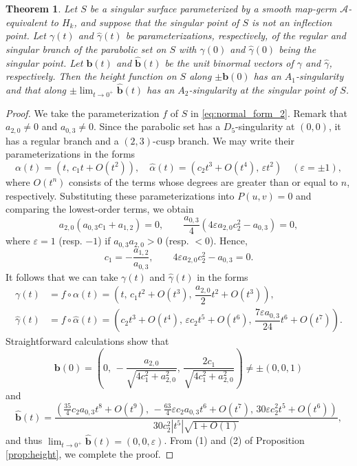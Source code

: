 \documentclass[12pt]{amsart}
\theoremstyle{plain}
\newtheorem{theorem}{Theorem}[section]
\theoremstyle{definition}
\renewcommand{\epsilon}{\varepsilon}
\begin{document}
\begin{theorem}
\label{thm:branch}
Let $S$ be a singular surface parameterized by a smooth map-germ $\mathcal{A}$-equivalent to $H_k$, and suppose that the singular point of $S$ is not an inflection point. 
Let $\gamma(t)$ and $\hat\gamma(t)$ be parameterizations, respectively, of the regular and singular branch of the parabolic set on $S$ with $\gamma(0)$ and $\hat\gamma(0)$ being the singular point. 
Let $\bm{b}(t)$ and $\hat{\bm{b}}(t)$ be the unit binormal vectors of $\gamma$ and $\hat\gamma$, respectively. 
Then the height function on $S$ along $\pm\bm{b}(0)$ has an $A_1$-singularity and that along $\pm\lim_{t \to 0^+}\hat{\bm{b}}(t)$ has an $A_2$-singularity at the singular point of $S$.
\end{theorem}
\begin{proof}
We take the parameterization $f$ of $S$ in \eqref{eq:normal_form_2}.
Remark that $a_{2,0}\ne0$ and $a_{0,3}\ne0$. 
Since the parabolic set has a $D_5$-singularity at $(0,0)$, it has a regular branch and a $(2,3)$-cusp branch. 
We may write their parameterizations in the forms
\begin{equation*}
\alpha(t) = \left(t,\, c_1 t + O(t^2)\right),\quad \hat\alpha(t) = (c_2 t^3 + O(t^4),\, \epsilon t^2)\quad(\epsilon=\pm1),
\end{equation*}
where $O(t^n)$ consists of the terms whose degrees are greater than or equal to $n$, respectively. 
Substituting these parameterizations into $P(u,v)=0$ and comparing the lowest-order terms, we obtain 
$$
a_{2,0}(a_{0,3}c_1+a_{1,2})=0,\qquad \dfrac{a_{0,3}}4(4\epsilon a_{2,0} c_2^2 - a_{0,3})=0,
$$
where $\epsilon = 1$ (resp. $-1$) if $a_{0,3}a_{2,0} > 0$ (resp. $< 0$). 
Hence, 
$$
c_1 = -\dfrac{a_{1,2}}{a_{0,3}},\qquad 4\epsilon a_{2,0} c_2^2 - a_{0,3} = 0.
$$
It follows that we can take $\gamma(t)$ and $\hat\gamma(t)$ in the forms
\begin{align*}
\gamma(t) & = f \circ \alpha(t) = \left(t,\, c_1 t^2 + O(t^3),\, \dfrac{a_{2,0}}2t^2 + O(t^3)\right), \\
\hat\gamma(t) & = f \circ \hat\alpha(t) = \left(c_2 t^3 + O(t^4),\, \epsilon c_2 t^5 + O(t^6),\, \dfrac{7\epsilon a_{0,3}}{24} t^6 + O(t^7)\right).
\end{align*}
Straightforward calculations show that
\[
\bm{b}(0) = \left(0,\, -\dfrac{a_{2,0}}{\sqrt{4c_1^2 + a_{2,0}^2}},\, \dfrac{2c_1}{\sqrt{4c_1^2 + a_{2,0}^2}}\right)\ne \pm(0,0,1)
\]
and
\[
\hat{\bm{b}}(t) =\dfrac{\left(\frac{35}4 c_2 a_{0,3}t^8 + O(t^9),\, -\frac{63}4 \epsilon c_2 a_{0,3} t^6 + O(t^7),\, 30 \epsilon c_2^2 t^5 + O(t^6)\right)}{30 c_2^2 |t^5| \sqrt{1 + O(1)}},
 \]
and thus $\lim_{t\to 0^+}\hat{\bm{b}}(t) = (0,0,\epsilon)$.
From (1) and (2) of Proposition \ref{prop:height}, we complete the proof. 
\end{proof}
\end{document}
